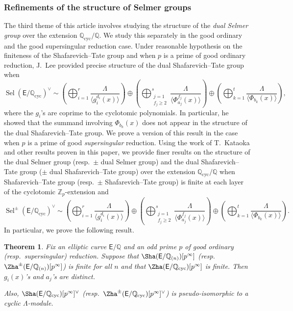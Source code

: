 \documentclass{amsart}
\newcommand{\edit}[1]{\textcolor{black}{#1}}
\numberwithin{equation}{section}
\newtheorem{lthm}{Theorem}
\theoremstyle{remark}
\newcommand{\EC}{\mathsf{E}}
\newcommand{\Zp}{\mathbb{Z}_p}
\newcommand{\Q}{\mathbb{Q}}
\newcommand{\cyc}{\operatorname{{cyc}}}
\newcommand{\Sel}{\operatorname{Sel}}
\theoremstyle{plain} %
\begin{document}
\subsubsection*{Refinements of the structure of Selmer groups}
The third theme of this article involves studying the structure of the \textit{dual Selmer group} over the extension $\Q_{\cyc}/\Q$.
We study this separately in the good ordinary and the good supersingular reduction case.
Under reasonable hypothesis on the finiteness of the Shafarevich--Tate group and when $p$ is a prime of good ordinary reduction, J.~Lee \edit{\cite{Lee20}} provided precise structure of the dual Shafarevich--Tate group when
\[
\Sel(\EC/\Q_{\cyc})^\vee \sim \left( \bigoplus_{i=1}^r \frac{\Lambda}{\langle g_i^{d_i}(x)\rangle}\right) \oplus \left(\bigoplus_{\substack{j=1\\ f_j\geq 2}}^s \frac{\Lambda}{\langle \Phi_{a_j}^{f_j}(x)\rangle}\right) \oplus \left(\bigoplus_{k=1}^t \frac{\Lambda}{\langle \Phi_{b_k}(x)\rangle} \right),
\]
where the $g_i$'s are coprime to the cyclotomic polynomials.
In particular, he showed that the summand involving $\Phi_{b_k}(x)$ does not appear in the structure of the dual Shafarevich--Tate group.
We prove a version of this result in the case when $p$ is a prime of good \emph{supersingular} reduction.
Using the work of T.~Kataoka \edit{\cite{Kat21}} and other results proven in this paper, we provide finer results on the structure of the dual Selmer group (resp.~$\pm$ dual Selmer group) and the dual Shafarevich--Tate group ($\pm$ dual Shafarevich--Tate group) over the   extension $\Q_{\cyc}/\Q$ when Shafarevich--Tate group (resp.~$\pm$ Shafarevich--Tate group) is finite at each layer of the cyclotomic $\Zp$-extension and
\[
\Sel^{\pm}(\EC/\Q_{\cyc})^\vee \sim \left( \bigoplus_{i=1}^r \frac{\Lambda}{\langle g_i^{d_i}(x)\rangle}\right) \oplus \left(\bigoplus_{\substack{j=1\\ f_j\geq 2}}^s \frac{\Lambda}{\langle \Phi_{a_j}^{f_j}(x)\rangle}\right) \oplus \left(\bigoplus_{k=1}^t \frac{\Lambda}{\langle \Phi_{b_k}(x)\rangle} \right).
\]
In particular, we prove the following result.

\begin{lthm}
Fix an elliptic curve $\EC/\Q$ and an odd prime $p$ of good \emph{ordinary} (resp.~\emph{supersingular}) reduction.
Suppose that $\Sha(\EC/\Q_{(n)})[p^{\infty}]$ \textup{(}resp.~$\Zha^{\pm}(\EC/\Q_{(n)})[p^{\infty}]$\textup{)} is finite for all $n$ and that $\Zha(\EC/\Q_{\cyc})[p^\infty]$ is finite.
Then $g_i(x)$'s and $a_j$'s are distinct.

Also, $\Sha(\EC/\Q_{\cyc})[p^\infty]^\vee$ \textup{(}resp.~$\Zha^{\pm}(\EC/\Q_{\cyc})[p^\infty]^\vee$\textup{)} is pseudo-isomorphic to a cyclic $\Lambda$-module.
\end{lthm}
\end{document}
